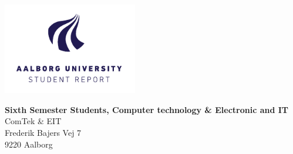 

{}
\thispagestyle{empty}

\begin{minipage}[t]{0.48\textwidth}
\vspace*{-25pt}			%
\includegraphics[height=4cm]{8Misc/Pictures/Introduction/AAU-logo-stud-UK-RGB.pdf}
\end{minipage}
\hfill
\begin{minipage}[t]{0.48\textwidth}{\small 
\textbf{Sixth Semester Students, Computer technology \& Electronic and IT}\\
ComTek \& EIT \\
Frederik Bajers Vej 7 \\
9220 Aalborg
}
\end{minipage}

\vspace*{1cm}

